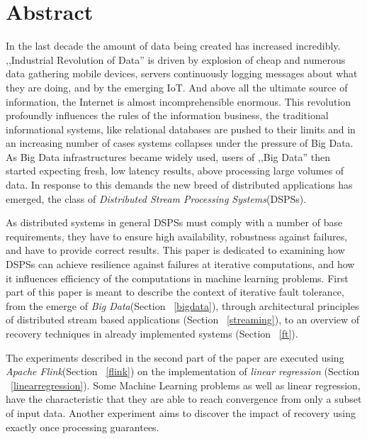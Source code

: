 



\section{Abstract}
In the last decade the amount of data being created has increased incredibly.  
,,Industrial Revolution of Data''\cite{aobd} is driven by explosion of cheap and numerous data gathering mobile devices, servers continuously 
logging messages about what they are doing, and by the emerging IoT. And above all the ultimate source of information, the Internet is almost incomprehensible enormous.
This revolution profoundly influences the rules of the information business, the traditional informational systems, 
like relational databases are pushed to their limits and in an increasing number of cases systems collapses under the pressure of Big Data.\cite{marz}
As Big Data infrastructures became widely used, users of ,,Big Data'' then started expecting fresh, low latency results, above processing large volumes of data. In response to this demands the new breed of distributed applications has emerged, the  class of \textit{Distributed  Stream  Processing Systems}(DSPSs).

As distributed systems in general DSPSs must comply with a number of base requirements, they have to ensure high availability, robustness against failures, and have to provide correct results.  
This paper is dedicated to examining how DSPSs can achieve resilience against failures at iterative computations, and how it influences efficiency of the computations in machine learning problems.
First part of this paper is meant to describe the context of iterative fault tolerance, from the emerge of \textit{Big Data}(Section ~\ref{bigdata}), through architectural principles of distributed stream based applications (Section ~\ref{streaming}), to an overview of recovery techniques in already implemented systems (Section ~\ref{ft}). 

The experiments described in the second part of the paper are executed using \textit{Apache Flink}(Section ~\ref{flink}) on the implementation of \textit{linear regression} (Section ~\ref{linearregression}). Some  Machine Learning problems as well as linear regression, have the characteristic that they are able to reach convergence from only a subset of input data.  Another experiment aims to discover the impact of recovery using exactly once processing guarantees.   
     
